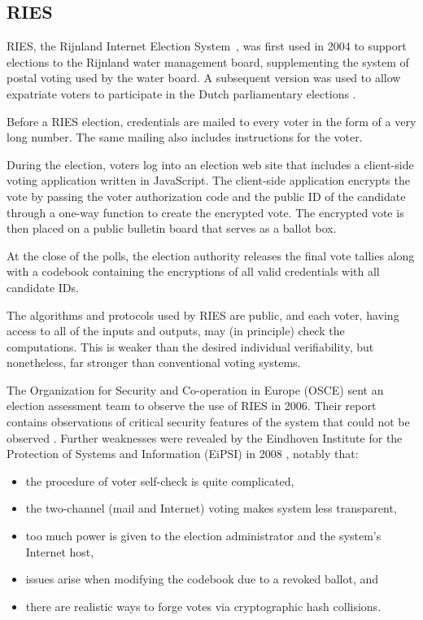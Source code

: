 \subsection{RIES}
\label{sec:ries} 

RIES, the Rijnland Internet Election System~\cite{hubbers2004}, was
first used in 2004 to support elections to the Rijnland water
management board, supplementing the system of postal voting used by
the water board. A subsequent version was used to allow expatriate
voters to participate in the Dutch parliamentary elections
\cite{gonggrijp2009}.

Before a RIES election, credentials are mailed to every voter in the
form of a very long number. The same mailing also includes
instructions for the voter.

During the election, voters log into an election web site that
includes a client-side voting application written in JavaScript. The
client-side application encrypts the vote by passing the voter
authorization code and the public ID of the candidate through a
one-way function to create the encrypted vote. The encrypted vote is
then placed on a public bulletin board that serves as a ballot box.

At the close of the polls, the election authority releases the final
vote tallies along with a codebook containing the encryptions of all
valid credentials with all candidate IDs.

The algorithms and protocols used by RIES are public, and each voter,
having access to all of the inputs and outputs, may (in principle)
check the computations. This is weaker than the desired individual
verifiability, but nonetheless, far stronger than conventional voting
systems.

The Organization for Security and Co-operation in Europe (OSCE) sent
an election assessment team to observe the use of RIES in 2006. Their
report contains observations of critical security features of the
system that could not be observed \cite{osce2007}. Further
weaknesses were revealed by the Eindhoven Institute for the Protection
of Systems and Information (EiPSI) in 2008 \cite{hubbers2008},
notably that:

\begin{itemize}
  \item the procedure of voter self-check is quite complicated,
  \item the two-channel (mail and Internet) voting makes system less
    transparent,
  \item too much power is given to the election administrator and the
    system's Internet host,
  \item issues arise when modifying the codebook due to a revoked
    ballot, and
  \item there are realistic ways to forge votes via cryptographic hash
    collisions.
\end{itemize}

